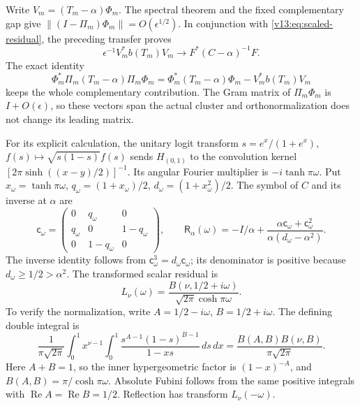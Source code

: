 Write $V_m=(T_m-\alpha)\Phi_m$.  The spectral theorem and the fixed
complementary gap give
$\|(I-\Pi_m)\Phi_m\|=O(\epsilon^{1/2})$.  In conjunction with
\eqref{v13:eq:scaled-residual}, the preceding transfer proves
\begin{equation}\label{v13:eq:complement-limit}
 \epsilon^{-1}V_m^*b(T_m)V_m\longrightarrow F^*(C-\alpha)^{-1}F.
\end{equation}
The exact identity
\begin{equation}\label{v13:eq:projected-effective-identity}
 \Phi_m^*\Pi_m(T_m-\alpha)\Pi_m\Phi_m
  =\Phi_m^*(T_m-\alpha)\Phi_m-V_m^*b(T_m)V_m
\end{equation}
keeps the whole complementary contribution.  The Gram matrix of
$\Pi_m\Phi_m$ is $I+O(\epsilon)$, so these vectors span the actual
cluster and orthonormalization does not change its leading matrix.

For its explicit calculation, the unitary logit transform
$s=e^x/(1+e^x)$, $f(s)\mapsto\sqrt{s(1-s)}f(s)$ sends
$H_{(0,1)}$ to the convolution kernel
$[2\pi\sinh((x-y)/2)]^{-1}$.  Its angular Fourier multiplier is
$-i\tanh\pi\omega$.  Put $x_\omega=\tanh\pi\omega$,
$q_\omega=(1+x_\omega)/2$, $d_\omega=(1+x_\omega^2)/2$.  The
symbol of $C$ and its inverse at $\alpha$ are
\[
 \mathsf c_\omega=
 \begin{pmatrix}0&q_\omega&0\\q_\omega&0&1-q_\omega\\
                 0&1-q_\omega&0\end{pmatrix},\qquad
 \mathsf R_\alpha(\omega)=-I/\alpha+
  \frac{\alpha\mathsf c_\omega+\mathsf c_\omega^2}
       {\alpha(d_\omega-\alpha^2)}.
\]
The inverse identity follows from
$\mathsf c_\omega^3=d_\omega\mathsf c_\omega$; its denominator is
positive because $d_\omega\ge1/2>\alpha^2$.
The transformed scalar residual is
\begin{equation}\label{v13:eq:residual-beta-transform}
 L_\nu(\omega)=\frac{B(\nu,1/2+i\omega)}
                    {\sqrt{2\pi}\cosh\pi\omega}.
\end{equation}
To verify the normalization, write $A=1/2-i\omega$, $B=1/2+i\omega$.
The defining double integral is
\[
 \frac1{\pi\sqrt{2\pi}}\int_0^1x^{\nu-1}\int_0^1
 \frac{s^{A-1}(1-s)^{B-1}}{1-xs}\,ds\,dx
 =\frac{B(A,B)B(\nu,B)}{\pi\sqrt{2\pi}}.
\]
Here $A+B=1$, so the inner hypergeometric factor is
$(1-x)^{-A}$, and $B(A,B)=\pi/\cosh\pi\omega$.
Absolute Fubini follows from the same positive integrals with
$\operatorname{Re}A=\operatorname{Re}B=1/2$.
Reflection has transform $L_\nu(-\omega)$.

